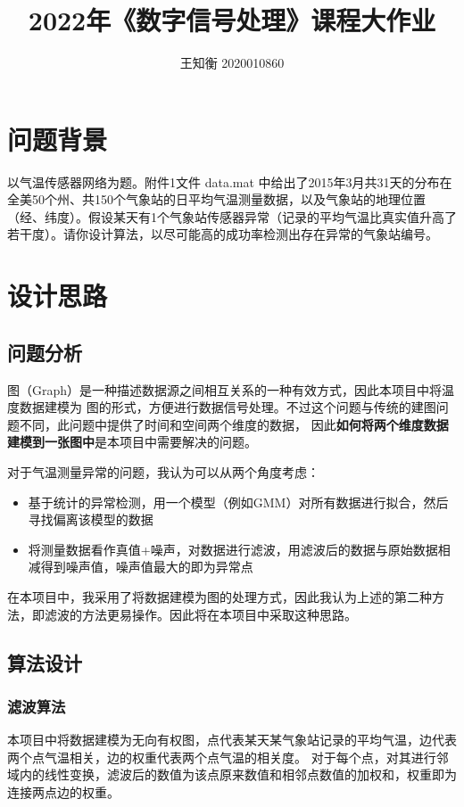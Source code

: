 \documentclass[a4paper]{ctexart}
\begin{document}
\title{\textbf{2022年《数字信号处理》课程大作业}}
\author{王知衡 2020010860}
\date{}
\maketitle

\section{问题背景}
以气温传感器网络为题。附件1文件 data.mat 中给出了2015年3月共31天的分布在全美50个州、共150个气象站的日平均气温测量数据，以及气象站的地理位置（经、纬度）。假设某天有1个气象站传感器异常（记录的平均气温比真实值升高了若干度）。请你设计算法，以尽可能高的成功率检测出存在异常的气象站编号。

\section{设计思路}
\subsection{问题分析}
图（Graph）是一种描述数据源之间相互关系的一种有效方式，因此本项目中将温度数据建模为
图的形式，方便进行数据信号处理。不过这个问题与传统的建图问题不同，此问题中提供了时间和空间两个维度的数据，
因此\textbf{如何将两个维度数据建模到一张图中}是本项目中需要解决的问题。

对于气温测量异常的问题，我认为可以从两个角度考虑：
\begin{itemize}
    \item 基于统计的异常检测，用一个模型（例如GMM）对所有数据进行拟合，然后寻找偏离该模型的数据
    \item 将测量数据看作真值+噪声，对数据进行滤波，用滤波后的数据与原始数据相减得到噪声值，噪声值最大的即为异常点
\end{itemize}

在本项目中，我采用了将数据建模为图的处理方式，因此我认为上述的第二种方法，即滤波的方法更易操作。因此将在本项目中采取这种思路。

\subsection{算法设计}
\subsubsection{滤波算法}
本项目中将数据建模为无向有权图，点代表某天某气象站记录的平均气温，边代表两个点气温相关，边的权重代表两个点气温的相关度。
对于每个点，对其进行邻域内的线性变换\cite{shuman2013emerging}，滤波后的数值为该点原来数值和相邻点数值的加权和，权重即为连接两点边的权重。
\end{document}
